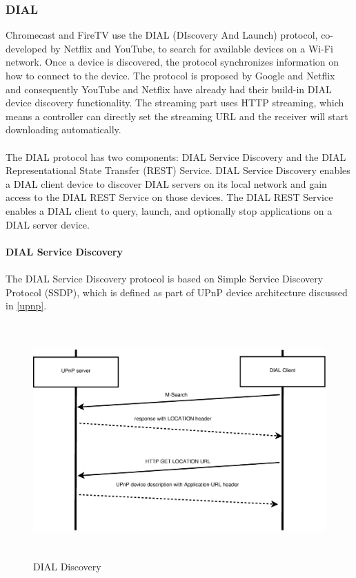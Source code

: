 \subsubsection{DIAL\label{2_2_4}} 
Chromecast and FireTV use the DIAL \cite{dial} (DIscovery And Launch) protocol,
co-developed by Netflix and YouTube, to search for available devices on a Wi-Fi network. 
Once a device is discovered, the protocol synchronizes information on how to 
connect to the device. The protocol is proposed by Google and Netflix and consequently 
YouTube and Netflix  have already had their build-in DIAL device discovery functionality. The 
streaming part uses HTTP streaming, which means a controller can directly set the 
streaming URL and the receiver will start downloading automatically. \\
\\
The DIAL protocol has two components: DIAL Service Discovery and the DIAL 
Representational State Transfer (REST) Service. DIAL Service Discovery enables a 
DIAL client device to discover DIAL servers on its local network and gain
access to the DIAL REST Service on those devices. The DIAL REST Service enables
a DIAL client to query, launch, and optionally stop applications on a DIAL
server device.\\
\\
\textbf{DIAL Service Discovery} \\
\\ 
The DIAL Service Discovery protocol is based on Simple Service Discovery 
Protocol (SSDP), which is defined as part of UPnP device architecture discussed 
in \ref{upnp}. \\
\begin{figure}[htb] \centering 
\includegraphics[height=9cm]{charts/dial_discovery} 
\caption{DIAL Discovery \label{dial_discovery}} 
\end{figure} 
